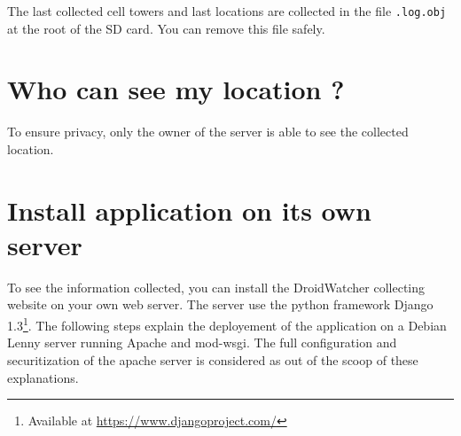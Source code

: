 \documentclass{article}
\begin{document}
The last collected cell towers and last locations are collected in the file \texttt{.log.obj} at the root of the SD card. You can remove this file safely.

\section{Who can see my location ?}

To ensure privacy, only the owner of the server is able to see the collected location.

\section{Install application on its own server}

To see the information collected, you can install the DroidWatcher collecting website on your own web server.
The server use the python framework Django 1.3\footnote{Available at \url{https://www.djangoproject.com/}}.
The following steps explain the deployement of the application on a Debian Lenny server running Apache and mod-wsgi. The full configuration and securitization of the apache server is considered as out of the scoop of these explanations.
\end{document}
